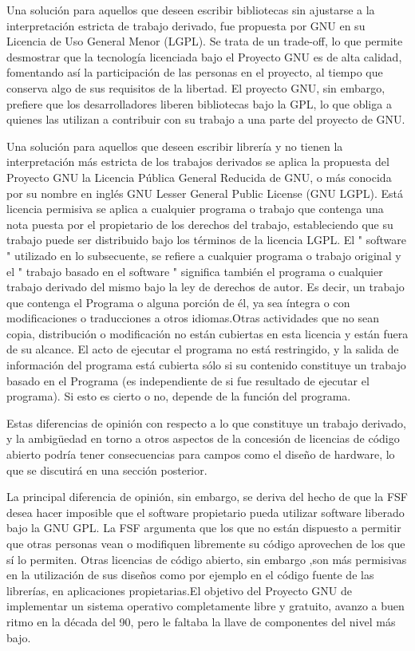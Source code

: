 	Una solución para aquellos que deseen escribir bibliotecas sin ajustarse a la interpretación estricta de trabajo derivado, fue
 	propuesta por GNU en su Licencia de Uso General Menor (LGPL). Se trata de un trade-off, lo que permite desmostrar que la tecnología licenciada bajo
 	el Proyecto GNU es de alta calidad, fomentando así la participación de las personas en el proyecto, al tiempo que conserva algo de sus requisitos
 	de la libertad. El proyecto GNU, sin embargo, prefiere que los desarrolladores liberen bibliotecas bajo la GPL, lo que obliga a quienes las
 	utilizan a contribuir con su trabajo a una parte del proyecto de GNU.
	
	Una solución para aquellos que deseen escribir librería y no tienen la interpretación más estricta de los trabajos derivados se aplica la propuesta
 	del Proyecto GNU la Licencia Pública General Reducida de GNU, o más conocida por su nombre en inglés GNU Lesser General Public License (GNU LGPL). Está
 	licencia permisiva se aplica a cualquier programa o trabajo que contenga una nota puesta por el propietario de los derechos del trabajo,
 	estableciendo que su trabajo puede ser distribuido bajo los términos de la licencia LGPL. El " software " utilizado en lo subsecuente, se refiere a cualquier programa o trabajo original y el " trabajo basado en el software " significa también el programa o cualquier trabajo derivado del mismo bajo la ley de derechos de autor. Es decir, un trabajo que contenga el Programa o alguna porción de él, ya sea íntegra o con modificaciones o traducciones a otros idiomas.Otras actividades que no sean copia, distribución o modificación no están cubiertas en esta licencia y están fuera de su alcance. El acto de ejecutar el programa no está restringido, y la salida de información del programa está cubierta sólo si su contenido constituye un trabajo basado en el Programa (es independiente de si fue resultado de ejecutar el programa). Si esto es cierto o no, depende de la función del programa.\cite{Etiqueta03} 

	Estas diferencias de opinión con respecto a lo que constituye un trabajo derivado, y la ambigüedad en torno a otros
	aspectos de la concesión de licencias de código abierto podría tener consecuencias para campos como el diseño de hardware, lo que se discutirá en una
	sección posterior.

	La principal diferencia de opinión, sin embargo, se deriva del hecho de que la FSF desea hacer imposible que el software
	propietario  pueda utilizar software liberado bajo la GNU GPL. La FSF argumenta que los que no están dispuesto a permitir que otras personas vean o
	modifiquen libremente su código aprovechen de los que sí lo permiten. Otras licencias de código abierto, sin embargo ,son más permisivas en la
	utilización de sus diseños como por ejemplo en el código fuente de las librerías, en aplicaciones propietarias.El objetivo del Proyecto GNU de implementar 
	un sistema operativo completamente libre y gratuito, avanzo a buen ritmo en la década del 90, pero le faltaba la llave de componentes del nivel más bajo.

